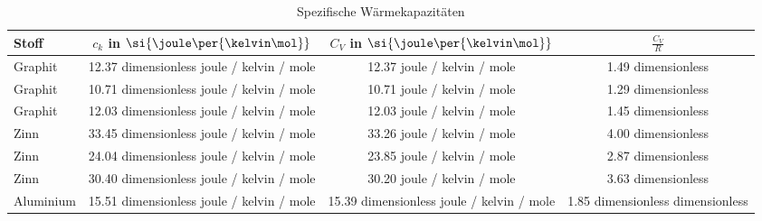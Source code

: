 \begin{table} 
 \centering 
 \begin{tabular}{lS S S } 
 \toprule  
 {Stoff} & {{$c_k$ in $\si{\joule \per {\kelvin \mol}}$}} & {{$C_V$ in $\si{\joule \per {\kelvin \mol}}$}}  &  {$\frac{C_V}{R}$}  \\ 
\midrule  
 {Graphit} & 12.37 dimensionless joule / kelvin / mole & 12.37 joule / kelvin / mole & 1.49 dimensionless  \\ 
{Graphit} & 10.71 dimensionless joule / kelvin / mole & 10.71 joule / kelvin / mole & 1.29 dimensionless  \\ 
{Graphit} & 12.03 dimensionless joule / kelvin / mole & 12.03 joule / kelvin / mole & 1.45 dimensionless  \\ 
{Zinn} & 33.45 dimensionless joule / kelvin / mole & 33.26 joule / kelvin / mole & 4.00 dimensionless  \\ 
{Zinn} & 24.04 dimensionless joule / kelvin / mole & 23.85 joule / kelvin / mole & 2.87 dimensionless  \\ 
{Zinn} & 30.40 dimensionless joule / kelvin / mole & 30.20 joule / kelvin / mole & 3.63 dimensionless  \\ 
{Aluminium} & 15.51 dimensionless joule / kelvin / mole & 15.39 dimensionless joule / kelvin / mole & 1.85 dimensionless dimensionless  \\ 
\bottomrule 
 \end{tabular} 
 \caption{Spezifische Wärmekapazitäten} 
 \label{tab: c_v} 
  \end{table}